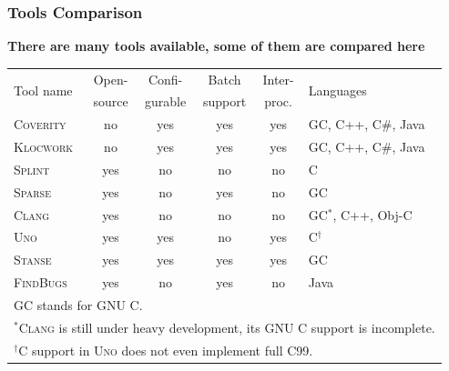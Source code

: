 \documentclass[xcolor=dvipsnames]{beamer}
\newcommand{\heading}[1]{\textbf{\textcolor{BurntOrange}{#1}}}
\begin{document}
\begin{frame}
\frametitle{Tools Comparison}
\heading{There are many tools available, some of them are compared here}
\begin{tabular}{l|ccccl}
\multirow{2}{*}{Tool name} &
Open- &
Confi- &
Batch &
Inter- &
\multirow{2}{*}{Languages} \\
                  & source & gurable & support & proc.  & \\ \hline
\textsc{Coverity} & no   & yes     & yes     & yes    & GC, C++, C\#, Java \\
\textsc{Klocwork} & no   & yes     & yes     & yes    & GC, C++, C\#, Java \\
\textsc{Splint}   & yes  & no      & no      & no     & C \\
\textsc{Sparse}   & yes  & no      & yes     & no     & GC \\
\textsc{Clang}    & yes  & no      & no      & no     & GC$^*$, C++, Obj-C \\
\textsc{Uno}      & yes  & yes     & no      & yes    & C$^\dagger$ \\
\textsc{Stanse}   & yes  & yes     & yes     & yes    & GC \\
\textsc{FindBugs} & yes  & no      & yes     & no     & Java \\ \hline
\multicolumn{6}{l}{\footnotesize GC stands for GNU C.} \\
\multicolumn{6}{l}{\footnotesize $^*$\textsc{Clang} is still under heavy
development, its GNU C support is incomplete.} \\
\multicolumn{6}{l}{\footnotesize $^\dagger$C support in \textsc{Uno} does not
even implement full C99.} \\
\end{tabular}
\end{frame}
\end{document}
